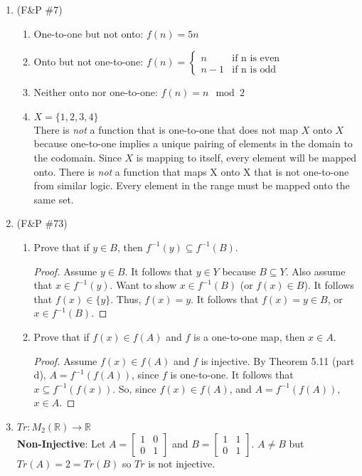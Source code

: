 \documentclass{article}
\theoremstyle{problem}
\theoremstyle{plain}
\theoremstyle{remark}
\begin{document}
\begin{enumerate}
    \item (F\&P {\small \#}7)
      \begin{enumerate} 
      \item One-to-one but not onto: $f(n) = 5n$
      \item Onto but not one-to-one: $f(n) = \begin{cases}
          n & \text{if n is even}\\
          n-1 & \text{if n is odd}
        \end{cases}$
      \item Neither onto nor one-to-one: $f(n) = n \mod 2$
      \item $X = \{1,2,3,4\}$\\
        There is \textit{not} a function that is one-to-one that does not map $X$ onto $X$ because one-to-one implies a unique pairing of elements in the domain to the codomain. Since $X$ is mapping to itself, every element will be mapped onto. There is \textit{not} a function that maps X onto X that is not one-to-one from similar logic. Every element in the range must be mapped onto the same set. 
      \end{enumerate}
     
    \item (F\&P {\small\#}73)
      \begin{enumerate} %
        \item Prove that if $y \in B$, then $f^{-1}(y) \subseteq f^{-1}(B)$.
          \begin{proof} Assume $y \in B$. It follows that $ y \in Y$ because $B \subseteq Y$. Also assume that $x \in f^{-1}(y)$. Want to show $x \in f^{-1}(B)$ (or $f(x) \in B$). It follows that $f(x) \in \{y\}$. Thus, $f(x) = y$. It follows that $f(x) = y \in B$, or $x \in f^{-1}(B)$.
          \end{proof}
        \item Prove that if $f(x) \in f(A)$ and $f$ is a one-to-one map, then $x \in A$.
          \begin{proof}
            Assume $f(x) \in f(A)$ and $f$ is injective. By Theorem 5.11 (part d), $A = f^{-1}(f(A))$, since $f$ is one-to-one. It follows that $x \subseteq f^{-1}(f(x))$. So, since $f(x) \in f(A)$, and $A = f^{-1}(f(A))$, $x \in A$.
          \end{proof}
        \end{enumerate} 
    \item $Tr : M_2(\mathbb{R}) \to \mathbb{R}$\\
      \textbf{Non-Injective}: Let $A = 
      \begin{bmatrix}
        1 & 0\\
        0 & 1
      \end{bmatrix}$
      and $B =
      \begin{bmatrix}
        1 & 1\\
        0 & 1
      \end{bmatrix}$. $A \not = B$ but $Tr(A) = 2 = Tr(B)$ so $Tr$ is not injective.\\


\end{enumerate}
\end{document}
